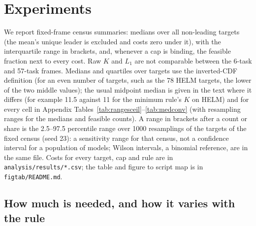\section{Experiments}
\label{sec:experiments}
We report fixed-frame census summaries: medians over all non-leading targets (the mean's unique leader is excluded and costs zero under it), with the interquartile range in brackets, and, whenever a cap is binding, the feasible fraction next to every cost. Raw $K$ and $L_1$ are not comparable between the 6-task and 57-task frames. Medians and quartiles over targets use the inverted-CDF definition (for an even number of targets, such as the 78 HELM targets, the lower of the two middle values); the usual midpoint median is given in the text where it differs (for example 11.5 against 11 for the minimum rule's $K$ on HELM) and for every cell in Appendix Tables~\ref{tab:rangesceil}--\ref{tab:medconv} (with resampling ranges for the medians and feasible counts). A range in brackets after a count or share is the 2.5--97.5 percentile range over 1000 resamplings of the targets of the fixed census (seed 23): a sensitivity range for that census, not a confidence interval for a population of models; Wilson intervals, a binomial reference, are in the same file. Costs for every target, cap and rule are in \texttt{analysis/results/*.csv}; the table and figure to script map is in \texttt{figtab/README.md}.

\subsection{How much is needed, and how it varies with the rule}
\begin{table}[t]
\caption{Minimum investment to become uniquely first, all non-leading targets of each fixed census: median [Q1, Q3] (inverted-CDF convention: lower middle value for even $N$) of tasks touched $K$ and total score points $L_1$ under the ceiling cap (scores may rise to 100) and under a 10-point per-task cap. feas.: targets that can reach first place; $^\dagger$: median over feasible targets only (a different target set for each rule). Condorcet winner is a requirement, an upper bound for Condorcet-consistent rules. Ordinal rules: HELM and the top-500 frame only (separate block; the frames are not pooled). Source: \texttt{analysis/results/summary/main\_descriptive.csv}.}
\label{tab:main}
\centering\scriptsize\setlength{\tabcolsep}{3pt}

\end{table}
